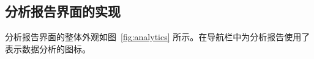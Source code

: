 \subsection{分析报告界面的实现}\label{subsec:analytics-ui}

分析报告界面的整体外观如图~\ref{fig:analytics} 所示。在导航栏中为分析报告使用了表示数据分析的图标。

\begin{figure}[ht]

\end{figure}
